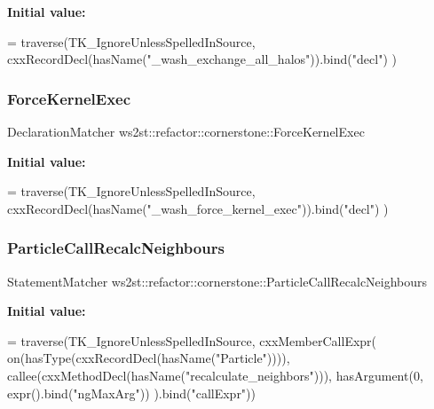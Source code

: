 {\bfseries Initial value\+:}
\begin{DoxyCode}
= traverse(TK\_IgnoreUnlessSpelledInSource, 
                cxxRecordDecl(hasName(\textcolor{stringliteral}{"\_wash\_exchange\_all\_halos"})).bind(\textcolor{stringliteral}{"decl"})
            )
\end{DoxyCode}
\mbox{\label{namespacews2st_1_1refactor_1_1cornerstone_a3aa1a698168a78f1fb752a76d9917d32}} 
\subsubsection{\texorpdfstring{Force\+Kernel\+Exec}{ForceKernelExec}}
{\footnotesize\ttfamily Declaration\+Matcher ws2st\+::refactor\+::cornerstone\+::\+Force\+Kernel\+Exec}

{\bfseries Initial value\+:}
\begin{DoxyCode}
= traverse(TK\_IgnoreUnlessSpelledInSource, 
                cxxRecordDecl(hasName(\textcolor{stringliteral}{"\_wash\_force\_kernel\_exec"})).bind(\textcolor{stringliteral}{"decl"})
            )
\end{DoxyCode}
\mbox{\label{namespacews2st_1_1refactor_1_1cornerstone_aa04cfbe64fbc48fbb5811ae89d63f959}} 
\subsubsection{\texorpdfstring{Particle\+Call\+Recalc\+Neighbours}{ParticleCallRecalcNeighbours}}
{\footnotesize\ttfamily Statement\+Matcher ws2st\+::refactor\+::cornerstone\+::\+Particle\+Call\+Recalc\+Neighbours}

{\bfseries Initial value\+:}
\begin{DoxyCode}
= traverse(TK\_IgnoreUnlessSpelledInSource, cxxMemberCallExpr(
                on(hasType(cxxRecordDecl(hasName(\textcolor{stringliteral}{"Particle"})))),
                callee(cxxMethodDecl(hasName(\textcolor{stringliteral}{"recalculate\_neighbors"}))),
                hasArgument(0, expr().bind(\textcolor{stringliteral}{"ngMaxArg"}))
            ).bind(\textcolor{stringliteral}{"callExpr"}))
\end{DoxyCode}
\mbox{\label{namespacews2st_1_1refactor_1_1cornerstone_a15e24b84e9919d46a634830608f131e9}} 
